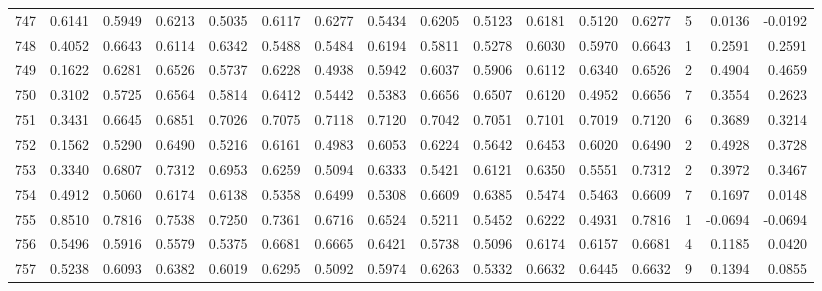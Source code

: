 \begin{tabular}{lrrrrrrrrrrrrrrr}
747 &      0.6141 &  0.5949 &  0.6213 &  0.5035 &  0.6117 &  0.6277 &  0.5434 &  0.6205 &  0.5123 &  0.6181 &   0.5120 &     0.6277 &      5 &                    0.0136 &                    -0.0192 \\
748 &      0.4052 &  0.6643 &  0.6114 &  0.6342 &  0.5488 &  0.5484 &  0.6194 &  0.5811 &  0.5278 &  0.6030 &   0.5970 &     0.6643 &      1 &                    0.2591 &                     0.2591 \\
749 &      0.1622 &  0.6281 &  0.6526 &  0.5737 &  0.6228 &  0.4938 &  0.5942 &  0.6037 &  0.5906 &  0.6112 &   0.6340 &     0.6526 &      2 &                    0.4904 &                     0.4659 \\
750 &      0.3102 &  0.5725 &  0.6564 &  0.5814 &  0.6412 &  0.5442 &  0.5383 &  0.6656 &  0.6507 &  0.6120 &   0.4952 &     0.6656 &      7 &                    0.3554 &                     0.2623 \\
751 &      0.3431 &  0.6645 &  0.6851 &  0.7026 &  0.7075 &  0.7118 &  0.7120 &  0.7042 &  0.7051 &  0.7101 &   0.7019 &     0.7120 &      6 &                    0.3689 &                     0.3214 \\
752 &      0.1562 &  0.5290 &  0.6490 &  0.5216 &  0.6161 &  0.4983 &  0.6053 &  0.6224 &  0.5642 &  0.6453 &   0.6020 &     0.6490 &      2 &                    0.4928 &                     0.3728 \\
753 &      0.3340 &  0.6807 &  0.7312 &  0.6953 &  0.6259 &  0.5094 &  0.6333 &  0.5421 &  0.6121 &  0.6350 &   0.5551 &     0.7312 &      2 &                    0.3972 &                     0.3467 \\
754 &      0.4912 &  0.5060 &  0.6174 &  0.6138 &  0.5358 &  0.6499 &  0.5308 &  0.6609 &  0.6385 &  0.5474 &   0.5463 &     0.6609 &      7 &                    0.1697 &                     0.0148 \\
755 &      0.8510 &  0.7816 &  0.7538 &  0.7250 &  0.7361 &  0.6716 &  0.6524 &  0.5211 &  0.5452 &  0.6222 &   0.4931 &     0.7816 &      1 &                   -0.0694 &                    -0.0694 \\
756 &      0.5496 &  0.5916 &  0.5579 &  0.5375 &  0.6681 &  0.6665 &  0.6421 &  0.5738 &  0.5096 &  0.6174 &   0.6157 &     0.6681 &      4 &                    0.1185 &                     0.0420 \\
757 &      0.5238 &  0.6093 &  0.6382 &  0.6019 &  0.6295 &  0.5092 &  0.5974 &  0.6263 &  0.5332 &  0.6632 &   0.6445 &     0.6632 &      9 &                    0.1394 &                     0.0855 \\

\end{tabular}
